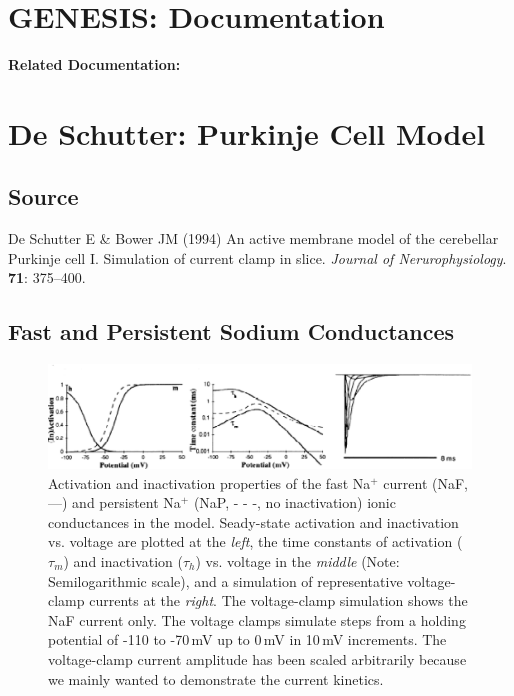 \documentclass[12pt]{article}
\begin{document}
\section*{GENESIS: Documentation}

{\bf Related Documentation:}

\section*{De Schutter: Purkinje Cell Model}

\subsection*{Source}

De Schutter E \& Bower JM (1994) An active membrane model of the cerebellar Purkinje cell I. Simulation of current clamp in slice. {\it Journal of Nerurophysiology}. {\bf 71}: 375--400. \\

\subsection*{Fast and Persistent Sodium Conductances}

\begin{figure}[h]
\centering
   \includegraphics[scale=0.75]{figures/DS1.2A.eps}
   \caption{Activation and inactivation properties of the fast Na$^+$ current (NaF, ---) and persistent Na$^+$ (NaP, - - -, no inactivation) ionic conductances in the model. Seady-state activation and inactivation vs. voltage are plotted at the {\em left}, the time constants of activation ($\tau_m$) and inactivation ($\tau_h$) vs. voltage in the {\em middle} (Note: Semilogarithmic scale), and a simulation of representative voltage-clamp currents at the {\em right}. The voltage-clamp simulation shows the NaF current only. The voltage clamps simulate steps from a holding potential of -110 to -70\,mV up to 0\,mV in 10\,mV increments. The voltage-clamp current amplitude has been scaled arbitrarily because we mainly wanted to demonstrate the current kinetics.}
   \label{fig:DS1.2A}
\end{figure}
\end{document}
